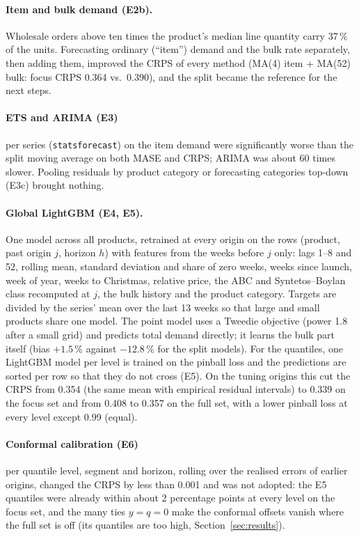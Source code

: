 \documentclass[11pt,a4paper]{article}
\begin{document}
\paragraph{Item and bulk demand (E2b).} Wholesale orders above ten times the product's median
line quantity carry 37\,\% of the units. Forecasting ordinary (``item'') demand and the bulk
rate separately, then adding them, improved the CRPS of every method (MA(4) item + MA(52) bulk:
focus CRPS 0.364 vs.\ 0.390), and the split became the reference for the next steps.

\paragraph{ETS and ARIMA (E3)} per series (\texttt{statsforecast}) on the item demand were
significantly worse than the split moving average on both MASE and CRPS; ARIMA was
about 60 times slower. Pooling residuals by product category or forecasting categories top-down
(E3c) brought nothing.

\paragraph{Global LightGBM (E4, E5).} One model across all products, retrained at every origin
on the rows (product, past origin $j$, horizon $h$) with features from the weeks before $j$
only: lags 1--8 and 52, rolling mean, standard deviation and share of zero weeks, weeks since
launch, week of year, weeks to Christmas, relative price, the ABC and Syntetos--Boylan class
recomputed at $j$, the bulk history and the product category. Targets are divided by the
series' mean over the last 13 weeks so that large and small products share one model. The
point model uses a Tweedie objective (power 1.8 after a small grid) and predicts total demand
directly; it learns the bulk part itself (bias $+1.5$\,\% against $-12.8$\,\% for the split
models). For the quantiles, one LightGBM model per level is trained on the pinball loss and the
predictions are sorted per row so that they do not cross (E5). On the tuning origins this cut
the CRPS from 0.354 (the same mean with empirical residual intervals) to 0.339 on the focus
set and from 0.408 to 0.357 on the full set, with a lower pinball loss at every level except
0.99 (equal).

\paragraph{Conformal calibration (E6)} per quantile level, segment and horizon, rolling over
the realised errors of earlier origins, changed the CRPS by less than 0.001 and was not adopted:
the E5 quantiles were already within about 2 percentage points at every level on the focus set,
and the many ties $y = q = 0$ make the conformal offsets vanish where the full set is off
(its quantiles are too high, Section~\ref{sec:results}).
\end{document}
